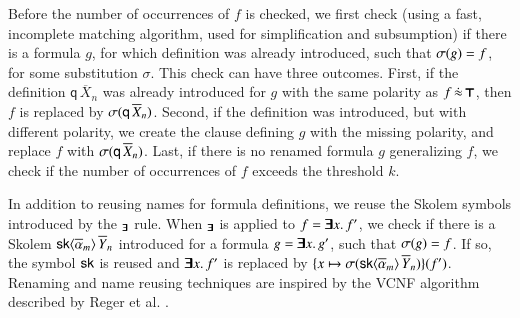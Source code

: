 Before the number of occurrences of $f$ is checked, we first check (using a
fast, incomplete matching algorithm, used for simplification and subsumption) if there is a
formula $g$, for which definition was already introduced, such that
$\sigma(g) = f$, for some substitution $\sigma$. This check can have three
outcomes. First, if the definition $\textsf{q} \, \overline{X}_n$ was already
introduced for $g$ with the same polarity as $f \, \dot{\approx} \,
\pmb{\top}$, then $f$ is replaced by $\sigma(\mathsf{q} \, \overline{X}_{n})$. Second, if
the definition was introduced, but with different polarity, we create the clause
defining $g$ with the missing polarity, and replace $f$ with $\sigma(\mathsf{q}
\, \overline{X}_{n})$. Last, if there is no renamed formula $g$ generalizing $f$,
we check if the number of occurrences of $f$ exceeds the threshold $k$.

In addition to reusing names for formula definitions, we reuse the Skolem
symbols introduced by the $_{\pmb{\exists}}$ rule. When
$_{\pmb{\exists}}$ is applied to $f = \pmb{\exists} x.\, f'$, we check if there is
a Skolem $\mathsf{sk}{\langle\overline{\alpha}_{m}\rangle} \, \overline{Y}_{n}$ introduced for a
formula $g = \pmb{\exists} x.\, g'$, such that $\sigma(g) = f$. If so, the symbol
$\mathsf{sk}$ is reused and $\pmb{\exists} x.\, f'$ is replaced by $\{x \mapsto
\sigma(\mathsf{sk}{\langle\overline{\alpha}_{m}\rangle} \, \overline{Y}_{n}) \}(f')$. Renaming and
name reusing techniques are inspired by the VCNF algorithm described by Reger et
al. \cite{rsv-16-vcnf}.





